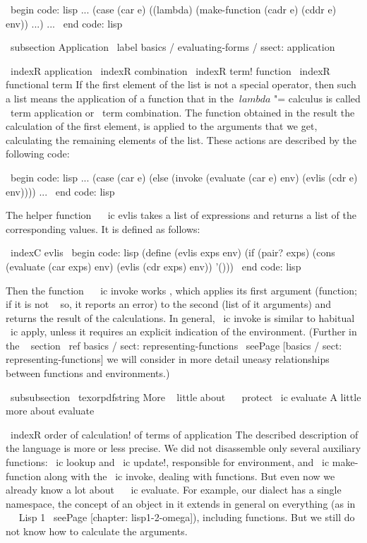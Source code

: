 {\ begin {code: lisp}
... (case (car e)
      ((lambda) (make-function (cadr e) (cddr e) env)) ...) ...
\ end {code: lisp}


\ subsection {Application} \ label {basics / evaluating-forms / ssect: application}

\ indexR {application}
\ indexR {combination}
\ indexR {term! function}
\ indexR {functional term}
If the first element of the list is not a special operator, then such a list
means the application of a function that in the $ \ lambda $ "= calculus is called
\ term {application} or \ term {combination}. The function obtained in the result
the calculation of the first element, is applied to the arguments that we get,
calculating the remaining elements of the list. These actions are described by the following code:

\ begin {code: lisp}
... (case (car e)
      (else (invoke (evaluate (car e) env)
                    (evlis (cdr e) env)))) ...
\ end {code: lisp}

The helper function ~ \ ic {evlis} takes a list of expressions and returns
a list of the corresponding values. It is defined as follows:

\ indexC {evlis}
\ begin {code: lisp}
(define (evlis exps env)
  (if (pair? exps)
      (cons (evaluate (car exps) env)
            (evlis (cdr exps) env))
      '()))
\ end {code: lisp}

Then the function ~ \ ic {invoke} works , which applies its first argument
(function; if it is not ~ so, it reports an error) to the second (list of it
arguments) and returns the result of the calculations. In general, \ ic {invoke} is similar to
habitual \ ic {apply}, unless it requires an explicit indication of the environment. (Further
in the ~ section \ ref {basics / sect: representing-functions}
\ seePage [basics / sect: representing-functions] we will consider in more detail uneasy
relationships between functions and environments.)


\ subsubsection { \ texorpdfstring {More ~ ​​little about ~ \ protect \ ic {evaluate}} %
{A little more about evaluate}}

\ indexR {order of calculation! of terms of application}
The described description of the language is more or less precise. We did not disassemble only
several auxiliary functions: \ ic {lookup} and \ ic {update!}, responsible for
environment, and \ ic {make-function} along with the \ ic {invoke}, dealing with functions.
But even now we already know a lot about ~ \ ic {evaluate}. For example, our dialect
has a single namespace, the concept of an object in it extends in general
on everything (as in ~ \ Lisp 1 \ seePage [chapter: lisp1-2-omega]), including functions.
But we still do not know how to calculate the arguments.

}

